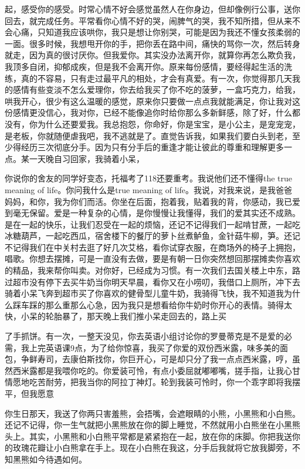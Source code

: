 \documentclass{article}
\begin{document}
\newpage 

起，感受你的感受。时常心情不好会感觉虽然人在你身边，但却像例行公事，送你回去，就完成任务。平常看你心情不好的哭，闹脾气的哭，我不知所措，但从来不会心痛，只知道我应该哄你，我只是想让你别哭，可能是因为我还不懂女孩柔弱的一面。很多时候，我想甩开你的手，把你丢在路中间，痛快的骂你一次，然后转身就走，因为真的很讨厌你。但我爱你。其实没办法离开你，就算你再怎么欺负我，我顶多自闭，抑郁成疾，但是我不会离开你。原来每份感情，要经得起生活的洗练，真的不容易，只有走过最平凡的相处，才会有真爱。有一次，你觉得那几天我的感情有些变淡不怎么爱理你，你去给我买了你不吃的菠萝，一盒巧克力，给我，哄我开心，很少有这么温暖的感觉，原来你只要做一点点我就能满足，你让我对这份感情更没信心，我对你，已经不能像追你时给你那么多新鲜感，除了好，什么都没有，你为什么还要爱我。我总抱怨，你命好，你是宝宝，是小公主，是宠宠宠，是老板，你就随便虐我吧，我不逃就是了。直觉告诉我，如果我们要白头到老，至少得经历三次彻底分手。因为只有分手后的重逢才能让彼此的尊重和理解更多一点。某一天晚自习回家，我骑着小呆，

\newpage 

你说你的舍友的同学好变态，托福考了118还要重考。我说他们还不懂得the true meaning of life。你问我什么是true meaning of life。我说，对我来说，是我爸爸妈妈，和你，我为你们而活。你坐在后面，抱着我，贴着我的背，你感动，我已爱到毫无保留。爱是一种复杂的心情，是你慢慢让我懂得，我们的爱其实还不成熟。是在一起的快乐，让我们忍受在一起的烦恼，还记不记得我们一起啃甘蔗，一起吃冰糖葫芦，一起吃西瓜，宿舍楼下的餐厅的萝卜丝煮鲈鱼，金针菇牛柳，笋。还记不记得我们在中关村去逛了好几次艾格，看你试穿衣服，在商场外的椅子上拥抱，唱歌。你想去摆摊，可是一直没有去做，要是有朝一日你突然想回那摆摊卖你喜欢的精品，我来帮你叫卖。对你好，已经成为习惯。有一次我们去国关楼上中东，路过超市没有停下去买牛奶当你明天早晨，看你又在小唠叨，我借口上厕所，冲下去骑着小呆飞奔到超市买了你喜欢的健骨型儿童牛奶，我骑得飞快，我不知道我为什么踩车踩的那么重那么心急，因为我只是想看给你牛奶时你开心的表情。骑得太快，小呆的轮胎暴了，那天晚上我们推小呆走回去的，路上买

\newpage 

了手抓饼。有一次，一整天没见，你去英语小组讨论你的罗曼蒂克是不是爱的必需，我上完英语课9点，为了给你惊喜，我买了你爱的双份西米露，味多美的面包，争鲜寿司，去康伯斯找你，你巨开心，可是却只分了我一点点西米露，哼，虽然西米露都是我喂你吃的。你爱装可怜，有点小委屈就嘟嘟嘴，搓手指，让我心甘情愿地吃苦耐劳，把我当你的阿拉丁神灯。轮到我装可怜时，你一个乖字即将我摆平，但我愿意

你生日那天，我送了你两只害羞熊，会捂嘴，会遮眼睛的小熊，小黑熊和小白熊。还记不记得，你一生气就把小黑熊放在你的脚上睡觉，不然就用小白熊坐在小黑熊头上。其实，小黑熊和小白熊平常都是紧紧抱在一起，放在你的床脚。你把我送你的玫瑰花瓣让小白熊拿在手上。现在小白熊在我这，分手后我就将它放我脚旁，不知黑熊如今待遇如何。
\end{document}
